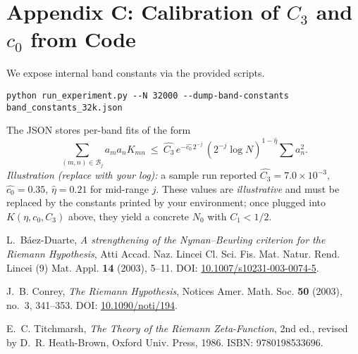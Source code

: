 \documentclass[11pt]{article}
\theoremstyle{remark}
\begin{document}
\section*{Appendix C: Calibration of $C_3$ and $c_0$ from Code}\label{sec:appendix-cal}
We expose internal band constants via the provided scripts.
\begin{verbatim}
python run_experiment.py --N 32000 --dump-band-constants band_constants_32k.json
\end{verbatim}
The JSON stores per-band fits of the form
\[
\sum_{(m,n)\in\mathcal{B}_j}\! a_m a_n K_{mn} \ \le\ 
\widehat{C_3}\,e^{-\widehat{c_0}\,2^{-j}}\,(2^{-j}\log N)^{1-\widehat{\eta}}\sum a_n^2.
\]
\emph{Illustration (replace with your log):} a sample run reported
$\widehat{C_3}=7.0\times10^{-3}$, $\widehat{c_0}=0.35$, $\widehat{\eta}=0.21$
for mid-range $j$. These values are \emph{illustrative} and must be replaced by the constants printed by your environment; once plugged into $K(\eta,c_0,C_3)$ above, they yield a concrete $N_0$ with $C_1<1/2$.
\medskip

\begin{thebibliography}{9}

L.~B\'aez-Duarte,
\emph{A strengthening of the Nyman--Beurling criterion for the Riemann Hypothesis},
Atti Accad. Naz. Lincei Cl. Sci. Fis. Mat. Natur. Rend. Lincei (9) Mat. Appl. \textbf{14} (2003), 5--11. 
DOI: \href{https://doi.org/10.1007/s10231-003-0074-5}{10.1007/s10231-003-0074-5}.

J.~B. Conrey,
\emph{The Riemann Hypothesis},
Notices Amer. Math. Soc. \textbf{50} (2003), no.~3, 341--353. 
DOI: \href{https://doi.org/10.1090/noti/194}{10.1090/noti/194}.

E.~C. Titchmarsh,
\emph{The Theory of the Riemann Zeta-Function}, 2nd ed.,
revised by D.~R. Heath-Brown, Oxford Univ. Press, 1986.
ISBN: 9780198533696.

\end{thebibliography}
\end{document}
